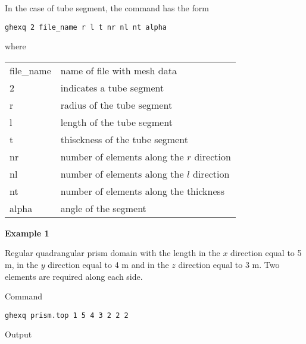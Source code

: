 \documentclass[12pt]{book}
\begin{document}
\vspace{2mm}
\noindent
In the case of tube segment, the command has the form

{\tt ghexq 2 file\_name r l t nr nl nt alpha}

\vspace{2mm}
\noindent
where

\vspace{2mm}
\noindent
\begin{center}
\begin{tabular}{ll}
file\_name & name of file with mesh data
\\
2 & indicates a tube segment
\\
r & radius of the tube segment
\\
l & length of the tube segment
\\
t & thisckness of the tube segment
\\
nr & number of elements along the $r$ direction
\\
nl & number of elements along the $l$ direction
\\
nt & number of elements along the thickness
\\
alpha & angle of the segment
\\
\end{tabular}
\end{center}

\vspace{3mm}
\noindent
{\bf Example 1}

\noindent
Regular quadrangular prism domain with the length in the $x$ direction equal to 5 m, in the
$y$ direction equal to 4 m and in the $z$ direction equal to 3 m. Two elements are required along each side.

\noindent
Command

{\tt ghexq prism.top  1  5 4 3 2 2 2}

\noindent
Output
\end{document}

